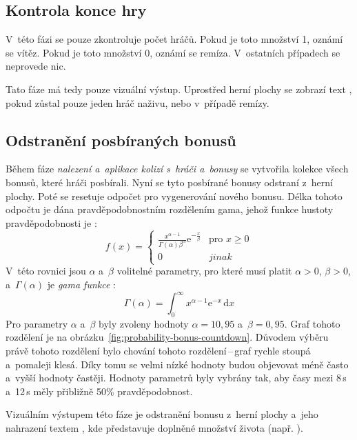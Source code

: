 \subsection*{Kontrola konce hry}

V~této fázi se pouze zkontroluje počet hráčů. Pokud je toto množství 1, oznámí se vítěz. Pokud je toto množství 0, oznámí se remíza. V~ostatních případech se neprovede nic.

Tato fáze má tedy pouze vizuální výstup. Uprostřed herní plochy se zobrazí text , pokud zůstal pouze jeden hráč naživu, nebo  v~případě remízy.

\subsection*{Odstranění posbíraných bonusů}

Během fáze \emph{nalezení a~aplikace kolizí s~hráči a~bonusy} se vytvořila kolekce všech bonusů, které hráči posbírali. Nyní se tyto posbírané bonusy odstraní z~herní plochy. Poté se resetuje odpočet pro vygenerování nového bonusu. Délka tohoto odpočtu je dána pravděpodobnostním rozdělením gama, jehož funkce hustoty pravděpodobnosti je \cite{Probability:Papoulis:2002}:
\begin{equation}
    f(x) = \left\{
    \begin{array}{ll}
        \frac{x^{\alpha-1}}{\Gamma(\alpha)\beta^\alpha}\mathrm{e}^{-\frac{x}{\beta}} & \text{pro }x \geq 0 \\
        0 & jinak
    \end{array}
    \right.
\end{equation}
V~této rovnici jsou $\alpha$ a~$\beta$ volitelné parametry, pro které musí platit $\alpha > 0$, $\beta > 0$, a~$\Gamma(\alpha)$ je \emph{gama funkce} \cite{Probability:Papoulis:2002}:
\begin{equation}
    \Gamma(\alpha) = \int_0^\infty x^{\alpha - 1}\mathrm{e}^{-x}\,\mathrm{d}x
\end{equation}
Pro parametry $\alpha$ a~$\beta$ byly zvoleny hodnoty $\alpha = 10{,}95$ a~$\beta = 0{,}95$. Graf tohoto rozdělení je na obrázku~\ref{fig:probability-bonus-countdown}. Důvodem výběru právě tohoto rozdělení bylo chování tohoto rozdělení\,--\,graf rychle stoupá a~pomaleji klesá. Díky tomu se velmi nízké hodnoty budou objevovat méně často a~vyšší hodnoty častěji. Hodnoty parametrů byly vybrány tak, aby časy mezi 8\,s a~12\,s měly přibližně 50\% pravděpodobnost.

Vizuálním výstupem této fáze je odstranění bonusu z~herní plochy a~jeho nahrazení textem , kde  představuje doplněné množství života (např. ).

